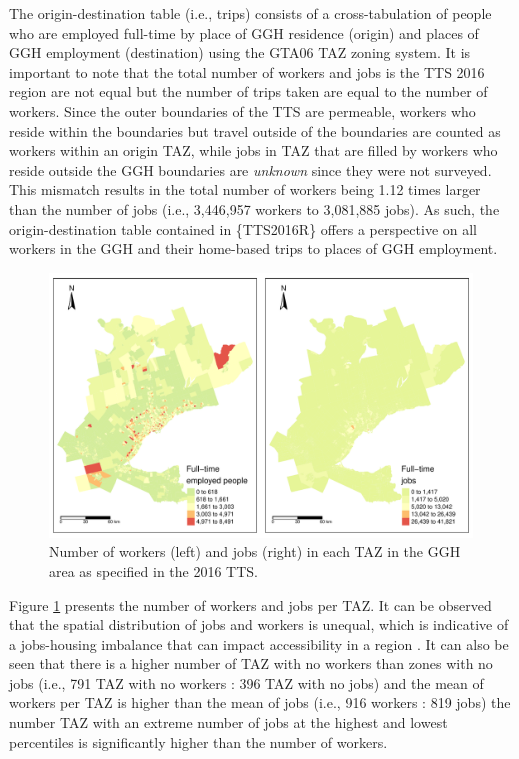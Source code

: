 \documentclass[Royal,times,sageh]{sagej}
\begin{document}
The origin-destination table (i.e., trips) consists of a
cross-tabulation of people who are employed full-time by place of GGH
residence (origin) and places of GGH employment (destination) using the
GTA06 TAZ zoning system. It is important to note that the total number
of workers and jobs is the TTS 2016 region are not equal but the number
of trips taken are equal to the number of workers. Since the outer
boundaries of the TTS are permeable, workers who reside within the
boundaries but travel outside of the boundaries are counted as workers
within an origin TAZ, while jobs in TAZ that are filled by workers who
reside outside the GGH boundaries are \emph{unknown} since they were not
surveyed. This mismatch results in the total number of workers being
1.12 times larger than the number of jobs (i.e., 3,446,957 workers to
3,081,885 jobs). As such, the origin-destination table contained in
\{TTS2016R\} offers a perspective on all workers in the GGH and their
home-based trips to places of GGH employment.

\begin{figure}
\includegraphics[width=1\linewidth]{Manuscript-Data-Package_files/figure-latex/tts-workers-jobs-plot-1} \caption{\label{fig:tts-workers-jobs-plot}Number of workers (left) and jobs (right) in each TAZ in the GGH area as specified in the 2016 TTS.}\label{fig:tts-workers-jobs-plot}
\end{figure}

Figure \ref{fig:tts-workers-jobs-plot} presents the number of workers
and jobs per TAZ. It can be observed that the spatial distribution of
jobs and workers is unequal, which is indicative of a jobs-housing
imbalance that can impact accessibility in a region
\citep{Levine1998rethinking}. It can also be seen that there is a higher
number of TAZ with no workers than zones with no jobs (i.e., 791 TAZ
with no workers : 396 TAZ with no jobs) and the mean of workers per TAZ
is higher than the mean of jobs (i.e., 916 workers : 819 jobs) the
number TAZ with an extreme number of jobs at the highest and lowest
percentiles is significantly higher than the number of workers.
\end{document}
